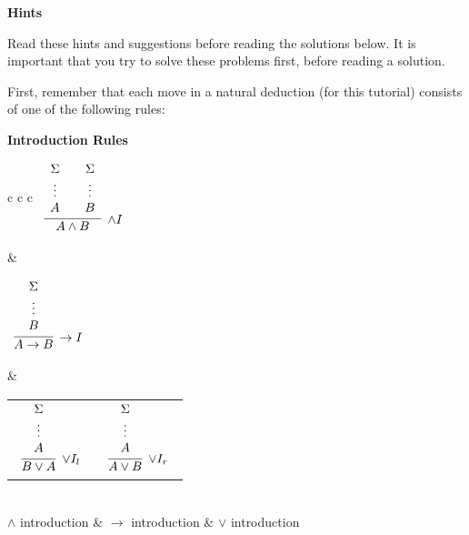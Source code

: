 \documentclass[11pt]{report}
\begin{document}
\newpage
\textbf{Hints}

Read these hints and suggestions before reading the solutions below. It is important that you try to solve these problems first, before reading a solution. 

First, remember that each move in a natural deduction (for this tutorial) consists of one of the following rules: 

\begin{center}
	\textbf{Introduction Rules}
\end{center}
\begin{scriptsize}
\begin{center}
	\begin{tabular}{c c c}
	$\begin{array}{c}\infer[\land I]{A \land B}		
		{\begin{array}{c} \Sigma \\ \vdots \\ A \end{array}
		&
		\begin{array}{c} \Sigma \\ \vdots \\ B \end{array}}
	\end{array}$

		\hspace{5mm}		
		&	
		\hspace{5mm}

	$\begin{array}{c}\infer[\to I]{A \to B}
		{\begin{array}{c} \Sigma \\ \vdots \\ B \end{array}}
	\end{array}$ 

		\hspace{5mm}
		&
		\hspace{5mm}

	\begin{tabular}{c c}
		$\begin{array}{c}\infer[\lor I_{l}]{B \lor A}
		{\begin{array}{c} \Sigma \\ \vdots \\ A \end{array}}\end{array}$
		&
		$\begin{array}{c}\infer[\lor I_{r}]{A \lor B}
		{\begin{array}{c} \Sigma \\ \vdots \\ A \end{array}}\end{array}$
	\end{tabular}\\
	$\land$ introduction & $\to$ introduction & $\lor$ introduction
	\end{tabular}
\end{center}
\end{scriptsize}
\end{document}

